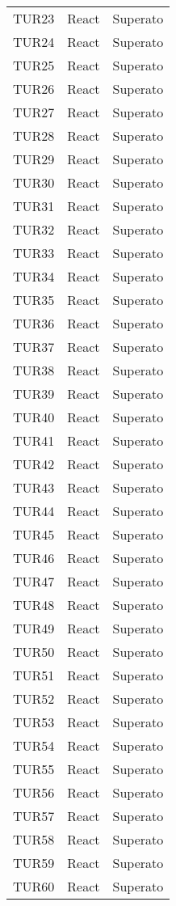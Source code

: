 \documentclass[PianoDiQualifica.tex]{subfiles}
\begin{document}
\begin{longtable}[H]{P{2cm}P{8.5cm}P{3cm}}
	TUR23 & React & Superato \\ 
	TUR24 & React & Superato \\ 
	TUR25 & React & Superato \\ 
	TUR26 & React & Superato \\ 
	TUR27 & React & Superato \\ 
	TUR28 & React & Superato \\ 
	TUR29 & React & Superato \\ 
	TUR30 & React & Superato \\ 
	TUR31 & React & Superato \\ 
	TUR32 & React & Superato \\ 
	TUR33 & React & Superato \\ 
	TUR34 & React & Superato \\ 
	TUR35 & React & Superato \\ 
	TUR36 & React & Superato \\ 
	TUR37 & React & Superato \\ 
	TUR38 & React & Superato \\ 
	TUR39 & React & Superato \\ 
	TUR40 & React & Superato \\ 
	TUR41 & React & Superato \\ 
	TUR42 & React & Superato \\ 
	TUR43 & React & Superato \\ 
	TUR44 & React & Superato \\ 
	TUR45 & React & Superato \\ 
	TUR46 & React & Superato \\ 
	TUR47 & React & Superato \\ 
	TUR48 & React & Superato \\ 
	TUR49 & React & Superato \\ 
	TUR50 & React & Superato \\ 
	TUR51 & React & Superato \\ 
	TUR52 & React & Superato \\ 
	TUR53 & React & Superato \\ 
	TUR54 & React & Superato \\ 
	TUR55 & React & Superato \\ 
	TUR56 & React & Superato \\ 
	TUR57 & React & Superato \\ 
	TUR58 & React & Superato \\ 
	TUR59 & React & Superato \\ 
	TUR60 & React & Superato \\ 

\end{longtable}
\end{document}
